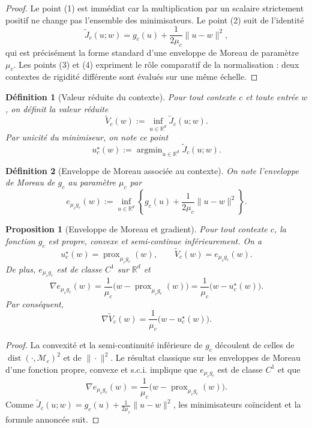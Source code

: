 \documentclass[11pt,a4paper]{article}
\newtheorem{definition}{Définition}[section]
\newtheorem{proposition}{Proposition}[section]
\DeclareMathOperator{\prox}{prox}
\DeclareMathOperator{\argmin}{argmin}
\DeclareMathOperator{\dist}{dist}
\newcommand{\R}{\mathbb R}
\newcommand{\Mcal}{\mathcal M}
\begin{document}
\begin{proof}
Le point (1) est immédiat car la multiplication par un scalaire strictement positif ne change pas l'ensemble des minimisateurs. Le point (2) suit de l'identité
\[
\widetilde J_c(u;w)=g_c(u)+\frac{1}{2\mu_c}\|u-w\|^2,
\]
qui est précisément la forme standard d'une enveloppe de Moreau de paramètre \(\mu_c\). Les points (3) et (4) expriment le rôle comparatif de la normalisation : deux contextes de rigidité différente sont évalués sur une même échelle.
\end{proof}

\begin{definition}[Valeur réduite du contexte]
Pour tout contexte \(c\) et toute entrée \(w\), on définit la valeur réduite
\[
\widetilde V_c(w)
:=
\inf_{u\in\R^d}\widetilde J_c(u;w).
\]
Par unicité du minimiseur, on note ce point
\[
u_c^\star(w):=\argmin_{u\in\R^d}\widetilde J_c(u;w).
\]
\end{definition}

\begin{definition}[Enveloppe de Moreau associée au contexte]
On note l'enveloppe de Moreau de \(g_c\) au paramètre \(\mu_c\) par
\[
 e_{\mu_c g_c}(w)
 :=
\inf_{u\in\R^d}
\left\{
 g_c(u)+\frac{1}{2\mu_c}\|u-w\|^2
\right\}.
\]
\end{definition}

\begin{proposition}[Enveloppe de Moreau et gradient]
Pour tout contexte \(c\), la fonction \(g_c\) est propre, convexe et semi-continue inférieurement. On a
\[
u_c^\star(w)=\prox_{\mu_c g_c}(w),
\qquad
\widetilde V_c(w)=e_{\mu_c g_c}(w).
\]
De plus, \(e_{\mu_c g_c}\) est de classe \(C^1\) sur \(\R^d\) et
\[
\nabla e_{\mu_c g_c}(w)=\frac{1}{\mu_c}\bigl(w-\prox_{\mu_c g_c}(w)\bigr)
=\frac{1}{\mu_c}\bigl(w-u_c^\star(w)\bigr).
\]
Par conséquent,
\[
\nabla \widetilde V_c(w)=\frac{1}{\mu_c}\bigl(w-u_c^\star(w)\bigr).
\]
\end{proposition}

\begin{proof}
La convexité et la semi-continuité inférieure de \(g_c\) découlent de celles de \(\dist(\cdot,\Mcal_c)^2\) et de \(\|\cdot\|^2\). Le résultat classique sur les enveloppes de Moreau d'une fonction propre, convexe et s.c.i. implique que \(e_{\mu_c g_c}\) est de classe \(C^1\) et que
\[
\nabla e_{\mu_c g_c}(w)=\frac{1}{\mu_c}\bigl(w-\prox_{\mu_c g_c}(w)\bigr).
\]
Comme \(\widetilde J_c(u;w)=g_c(u)+\frac{1}{2\mu_c}\|u-w\|^2\), les minimisateurs coïncident et la formule annoncée suit.
\end{proof}
\end{document}
